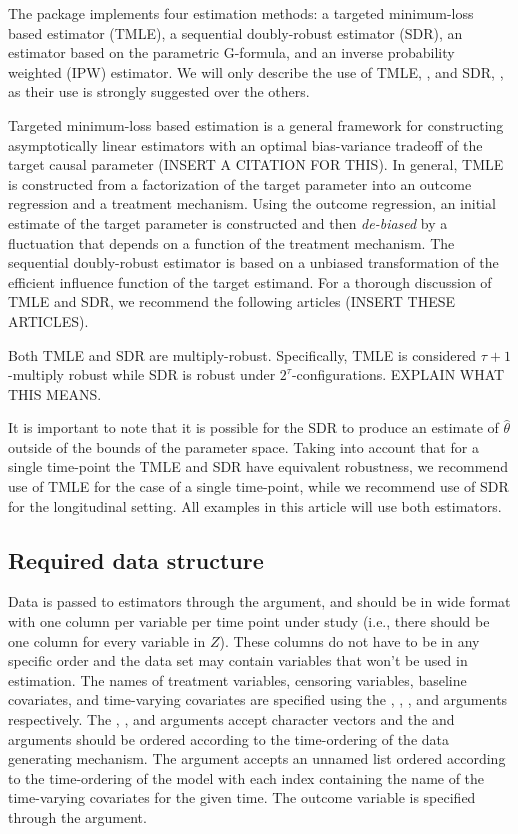 \documentclass[]{jss}
\begin{document}
The  package implements four estimation methods: a targeted
minimum-loss based estimator (TMLE), a sequential doubly-robust
estimator (SDR), an estimator based on the parametric G-formula, and an inverse
probability weighted (IPW) estimator. We will only describe the use of
TMLE, , and SDR, , as
their use is strongly suggested over the others.

Targeted minimum-loss based estimation is a general framework for constructing
asymptotically linear estimators with an optimal bias-variance tradeoff 
of the target causal parameter (INSERT A CITATION FOR THIS). In general, 
TMLE is constructed from a factorization of the target parameter 
into an outcome regression and a treatment mechanism. Using the outcome regression, 
an initial estimate of the target parameter is constructed and then \textit{de-biased} 
by a fluctuation that depends on a function of the treatment mechanism. The sequential
doubly-robust estimator is based on a unbiased transformation of the efficient influence
function of the target estimand. For a thorough discussion of TMLE and SDR, we
recommend the following articles (INSERT THESE ARTICLES).

Both TMLE and SDR are multiply-robust. Specifically, 
TMLE is considered \(\tau + 1\)-multiply robust while SDR is
robust under \(2^{\tau}\)-configurations. EXPLAIN WHAT THIS MEANS. 

It is important to note that it is possible for the SDR to produce an estimate of \(\hat{\theta}\)
outside of the bounds of the parameter space. Taking into account that for a single time-point
the TMLE and SDR have equivalent robustness, we recommend use of TMLE for the case of a single time-point, 
while we recommend use of SDR for the longitudinal setting. All examples in this article will use
both estimators.

\hypertarget{required-data-structure}{%
\subsection{Required data structure}\label{required-data-structure}}

Data is passed to  estimators through the 
argument, and should be in wide format with one column per variable per
time point under study (i.e., there should be one column for every
variable in \(Z\)). These columns do not have to be in any specific
order and the data set may contain variables that won't be used in
estimation. The names of treatment variables, censoring variables,
baseline covariates, and time-varying covariates are specified using the
, , , and  arguments
respectively. The , , and  arguments
accept character vectors and the  and  arguments
should be ordered according to the time-ordering of the data generating
mechanism. The  argument accepts an unnamed list ordered
according to the time-ordering of the model with each index containing
the name of the time-varying covariates for the given time. The outcome
variable is specified through the  argument.
\end{document}
